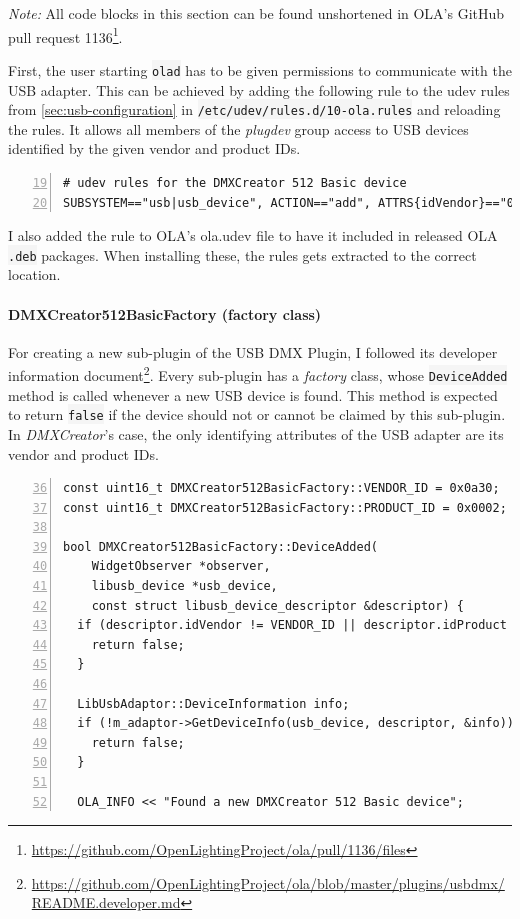 \emph{Note:} All code blocks in this section can be found unshortened in
OLA's GitHub pull request 1136\footnote{\url{https://github.com/OpenLightingProject/ola/pull/1136/files}}.

First, the user starting \colorbox{WhiteSmoke}{\lstinline!olad!} has to be given permissions to
communicate with the USB adapter. This can be achieved by adding the
following rule to the udev rules from \cref{sec:usb-configuration} in
\colorbox{WhiteSmoke}{\lstinline!/etc/udev/rules.d/10-ola.rules!} and reloading the rules. It
allows all members of the \emph{plugdev} group access to USB devices
identified by the given vendor and product IDs.

\begin{lstlisting}[numbers=left, style=myBash, firstnumber=19]
# udev rules for the DMXCreator 512 Basic device
SUBSYSTEM=="usb|usb_device", ACTION=="add", ATTRS{idVendor}=="0a30", ATTRS{idProduct}=="0002", GROUP="plugdev"
\end{lstlisting}

I also added the rule to OLA's \gls{ola.udev} file to have it included
in released OLA \colorbox{WhiteSmoke}{\lstinline!.deb!} packages. When installing these, the
rules gets extracted to the correct location.

\paragraph{DMXCreator512BasicFactory (factory
class)}\label{dmxcreator512basicfactory-factory-class}

For creating a
new sub-plugin of the USB DMX Plugin, I followed its developer
information document\footnote{\url{https://github.com/OpenLightingProject/ola/blob/master/plugins/usbdmx/README.developer.md}}.
Every sub-plugin has a \emph{factory} class, whose
\colorbox{WhiteSmoke}{\lstinline!DeviceAdded!} method is called whenever a new USB device is
found. This method is expected to return \colorbox{WhiteSmoke}{\lstinline!false!} if the device
should not or cannot be claimed by this sub-plugin. In
\emph{DMXCreator}'s case, the only identifying attributes of the USB
adapter are its vendor and product IDs.

\begin{lstlisting}[numbers=left, style=myCpp, firstnumber=36, caption={[Excerpt from \glsfont{DMXCreator512BasicFactory.cpp}]Excerpt from \gls{usbdmx:DMXCreator512BasicFactory.cpp}.}]
const uint16_t DMXCreator512BasicFactory::VENDOR_ID = 0x0a30;
const uint16_t DMXCreator512BasicFactory::PRODUCT_ID = 0x0002;

bool DMXCreator512BasicFactory::DeviceAdded(
    WidgetObserver *observer,
    libusb_device *usb_device,
    const struct libusb_device_descriptor &descriptor) {
  if (descriptor.idVendor != VENDOR_ID || descriptor.idProduct != PRODUCT_ID) {
    return false;
  }

  LibUsbAdaptor::DeviceInformation info;
  if (!m_adaptor->GetDeviceInfo(usb_device, descriptor, &info)) {
    return false;
  }

  OLA_INFO << "Found a new DMXCreator 512 Basic device";
\end{lstlisting}

